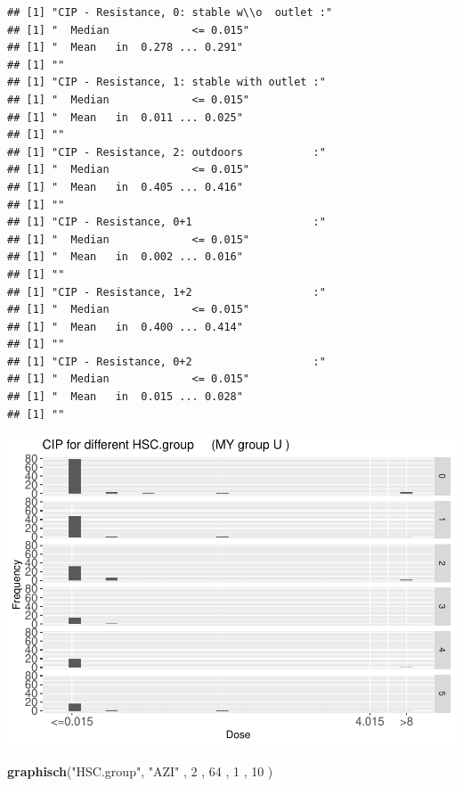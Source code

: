 \documentclass[
]{article}
\newenvironment{Shaded}{\begin{snugshade}}{\end{snugshade}}
\newcommand{\DecValTok}[1]{\textcolor[rgb]{0.00,0.00,0.81}{#1}}
\newcommand{\KeywordTok}[1]{\textcolor[rgb]{0.13,0.29,0.53}{\textbf{#1}}}
\newcommand{\NormalTok}[1]{#1}
\newcommand{\StringTok}[1]{\textcolor[rgb]{0.31,0.60,0.02}{#1}}
\begin{document}
\begin{verbatim}
## [1] "CIP - Resistance, 0: stable w\\o  outlet :"
## [1] "  Median             <= 0.015"
## [1] "  Mean   in  0.278 ... 0.291"
## [1] ""
## [1] "CIP - Resistance, 1: stable with outlet :"
## [1] "  Median             <= 0.015"
## [1] "  Mean   in  0.011 ... 0.025"
## [1] ""
## [1] "CIP - Resistance, 2: outdoors           :"
## [1] "  Median             <= 0.015"
## [1] "  Mean   in  0.405 ... 0.416"
## [1] ""
## [1] "CIP - Resistance, 0+1                   :"
## [1] "  Median             <= 0.015"
## [1] "  Mean   in  0.002 ... 0.016"
## [1] ""
## [1] "CIP - Resistance, 1+2                   :"
## [1] "  Median             <= 0.015"
## [1] "  Mean   in  0.400 ... 0.414"
## [1] ""
## [1] "CIP - Resistance, 0+2                   :"
## [1] "  Median             <= 0.015"
## [1] "  Mean   in  0.015 ... 0.028"
## [1] ""
\end{verbatim}

\includegraphics{Verteilungen_files/figure-latex/unnamed-chunk-46-1.pdf}

\begin{Shaded}
\begin{Highlighting}[]
   \KeywordTok{graphisch}\NormalTok{(}\StringTok{"HSC.group"}\NormalTok{, }\StringTok{"AZI"}\NormalTok{ , }\DecValTok{2}\NormalTok{    ,  }\DecValTok{64}\NormalTok{   ,   }\DecValTok{1}\NormalTok{    ,   }\DecValTok{10}\NormalTok{    )}
\end{Highlighting}
\end{Shaded}
\end{document}
